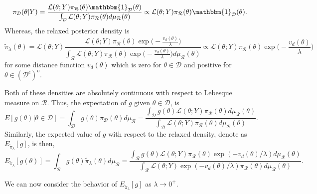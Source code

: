 \documentclass[10pt,fleqn]{article}
\DeclareMathOperator{\1}{\mathbbm{1}}
\begin{document}
$$\pi_\mathcal{D}(\theta|Y) = \frac{\mathcal{L}(\theta; Y) \pi_\mathcal{R}(\theta)\mathbbm{1}_\mathcal{D}(\theta)}{\int_\mathcal{D} \mathcal{L}(\theta; Y) \pi_\mathcal{R}(\theta)d\mu_\mathcal{R}(\theta)}\propto \mathcal{L}(\theta; Y) \pi_\mathcal{R}(\theta)\mathbbm{1}_\mathcal{D}(\theta). $$  Whereas, the relaxed posterior density is
$$\tilde{\pi}_\lambda(\theta) = \mathcal{L}(\theta; Y) \frac{\mathcal{L}(\theta; Y)\pi_\mathcal{R}(\theta)\exp\big(-\frac{v_d(\theta)}{\lambda}\big)}{\int_{\mathcal{R}}\mathcal{L}(\theta; Y) \pi_\mathcal{R}(\theta)\exp\big(-\frac{v_d(\theta)}{\lambda}\big) d\mu_\mathcal{R}(\theta)} \propto \mathcal{L}(\theta; Y) \pi_\mathcal{R}(\theta)\exp\big(-\frac{v_d(\theta)}{\lambda}\big)$$
for some distance function $v_d(\theta)$ which is zero for $\theta \in \mathcal{D}$ and positive for $\theta \in (\mathcal{D}^c)^o.$  

Both of these densities are absolutely continuous with respect to Lebesque measure on $\mathcal{R}$.  Thus, the expectation of $g$ given $\theta\in\mathcal{D}$, is
\begin{equation}
\label{EQ:Expectation_Positive_Measure_Constraint}
E[g(\theta)|\theta\in\mathcal{D}] = \int_\mathcal{D} g(\theta)\pi_\mathcal{D}(\theta)d\mu_\mathcal{R} = \frac{\int_\mathcal{D} g(\theta)\mathcal{L}(\theta; Y) \pi_\mathcal{R}(\theta)d\mu_\mathcal{R}(\theta)}{\int_\mathcal{D} \mathcal{L}(\theta; Y) \pi_\mathcal{R}(\theta)d\mu_\mathcal{R}(\theta)}.
\end{equation} 
Similarly, the expected value of $g$ with respect to the relaxed density, denote as $E_{\tilde{\pi}_\lambda}[g]$, is then,
\begin{equation}
\label{EQ:Expectation_Positive_Measure_Relaxed}
E_{\tilde{\pi}_\lambda}[g(\theta)] = \int_\mathcal{R} g(\theta)\tilde{\pi}_\lambda(\theta)d\mu_\mathcal{R} = \frac{\int_\mathcal{R} g(\theta)\mathcal{L}(\theta; Y) \pi_\mathcal{R}(\theta) \exp(-v_d(\theta)/\lambda)d\mu_\mathcal{R}(\theta)}{\int_\mathcal{R} \mathcal{L}(\theta; Y)\exp(-v_d(\theta)/\lambda) \pi_\mathcal{R}(\theta)d\mu_\mathcal{R}(\theta)}.\end{equation}

We can now consider the behavior of $E_{\tilde{\pi}_\lambda}[g]$ as $\lambda \to 0^+.$
\end{document}
